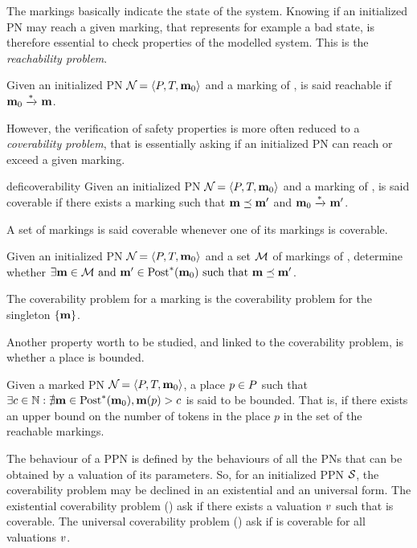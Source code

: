 The markings basically indicate the state of the system.
Knowing if an initialized \ac{PN} may reach a given marking, that represents for example a bad state, is therefore essential to check properties of the modelled system.
This is the \emph{reachability problem}.

\begin{defi}[Reachability]
  Given an initialized \ac{PN} $\defPN$ and a marking \mar of \namePN, \mar is said reachable if $\mathbf{m}_0 \xrightarrow{*}_{} \mathbf{m}$.
\end{defi}

However, the verification of safety properties is more often reduced to a \emph{coverability problem}, that is essentially asking if an initialized \ac{PN} can reach or exceed a given marking.

\begin{restatable}[Coverability]{defi}{coverability}
  Given an initialized \ac{PN} $\defPN$ and a marking \mar of \namePN, \mar is said coverable if there exists a marking \marp such that $\mathbf{m} \preceq \mathbf{m'}$ and $\mathbf{m}_0 \xrightarrow{*}_{} \mathbf{m'}$.

  A set of markings is said coverable whenever one of its markings is coverable.
\end{restatable}

\begin{defi}
  Given an initialized \ac{PN} $\defPN$ and a set $\mathcal{M}$ of markings of \namePN, determine whether $\exists \mathbf{m} \in \mathcal{M} \text{ and } \mathbf{m'} \in \operatorname{Post}^*_{{}}(\mathbf{m}_0) \text{ such that } \mathbf{m} \preceq \mathbf{m'}$.

  The coverability problem for a marking \mar is the coverability problem for the singleton $\{\mathbf{m}\}$.
\end{defi}

Another property worth to be studied, and linked to the coverability problem, is whether a place is bounded.

\begin{defi}
  \label{defi:place-boundedness}
  Given a marked PN $\defPN$,
  a place $p \in P$ such that $\exists c \in \mathbb{N} : \nexists \mathbf{m} \in \operatorname{Post}^*_{{}}(\mathbf{m}_0), \mathbf{m}(p) > c$ is said to be bounded.
  That is, if there exists an upper bound on the number of tokens in the place $p$ in the set of the reachable markings.
\end{defi}

The behaviour of a \ac{PPN} is defined by the behaviours of all the \acp{PN} that can be obtained by a valuation of its parameters.
So, for an initialized \ac{PPN} $\mathcal{S}_{{}}$, the coverability problem may be declined in an existential and an universal form.
The existential coverability problem (\Ecov) ask if there exists a valuation $\val$ such that \mar is coverable.
The universal coverability problem (\Ucov) ask if \mar is coverable for all valuations $\val$.

